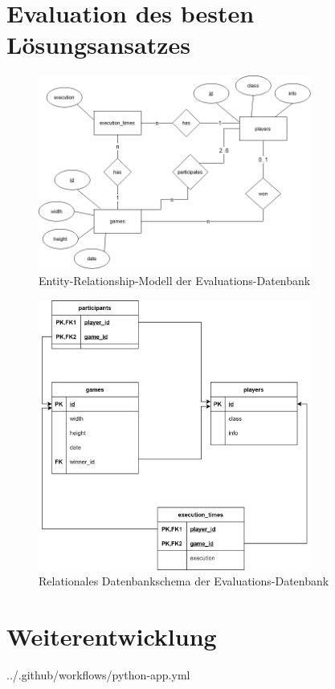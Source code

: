 \section{Evaluation des besten Lösungsansatzes}
\label{sec:anhang-evaluation-loesungsansatz}

\begin{figure}[htb]
	\centering
	\includegraphics[width=0.8\textwidth]{Bilder/er-diagram.png}
	\caption{Entity-Relationship-Modell der Evaluations-Datenbank}
	\label{fig:er-schema}
\end{figure}

\begin{figure}[htb]
	\centering
	\includegraphics[width=0.8\textwidth]{Bilder/relationales_db_schema.png}
	\caption{Relationales Datenbankschema der Evaluations-Datenbank}
	\label{fig:relationales-db-schema}
\end{figure}

\section{Weiterentwicklung}
\label{sec:anhang-weiterentwicklung}

\begin{minipage}{\textwidth}
	
	{../.github/workflows/python-app.yml}
\end{minipage}
